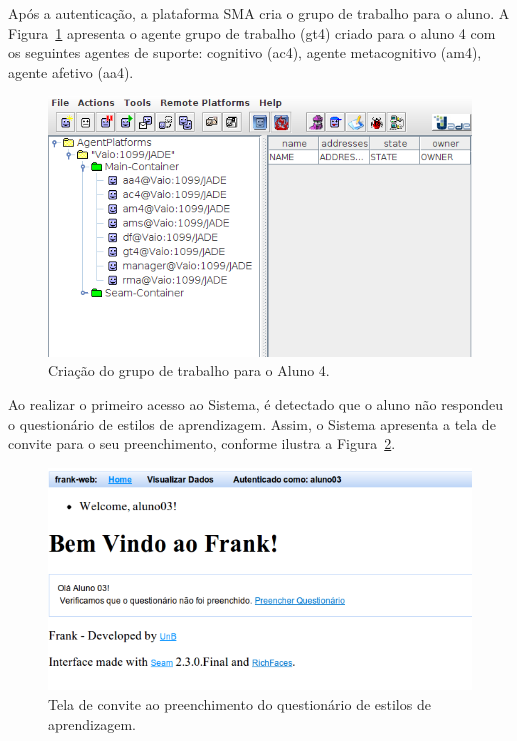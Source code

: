 Após a autenticação, a plataforma SMA cria o grupo de trabalho para o aluno. A Figura~\ref{fig:agente-rma-login-usuario} apresenta o agente grupo de trabalho (gt4) criado para o aluno 4 com os seguintes agentes de suporte: cognitivo (ac4), agente metacognitivo (am4), agente afetivo (aa4).
\begin{figure}
	\centering
	\includegraphics[scale=0.6]{images/agente-rma-login-usuario.png}
	\caption{Criação do grupo de trabalho para o Aluno 4.}
	\label{fig:agente-rma-login-usuario}
\end{figure}

Ao realizar o primeiro acesso ao Sistema, é detectado que o aluno não respondeu o questionário de estilos de aprendizagem. Assim, o Sistema apresenta a tela de convite para o seu preenchimento, conforme ilustra a Figura~\ref{fig:frank-tela-aluno-prim-acesso}.

\begin{figure}
	\centering
	\includegraphics[scale=0.6]{images/frank-tela-aluno-prim-acesso.png}
	\caption{Tela de convite ao preenchimento do questionário de estilos de aprendizagem.}
	\label{fig:frank-tela-aluno-prim-acesso}
\end{figure}

